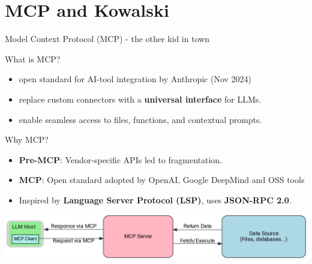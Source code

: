 \documentclass[aspectratio=169]{beamer}
\begin{document}
\section{MCP and Kowalski}
\begin{frame}{Model Context Protocol (MCP) - the other kid in town}
    \begin{block}{What is MCP?}
    \begin{itemize}
        \item open standard for AI-tool integration by Anthropic (Nov 2024)
        \item replace custom connectors with a \textbf{universal interface} for LLMs.
        \item enable seamless access to files, functions, and contextual prompts.
    \end{itemize}
    \end{block}
    \begin{block}{Why MCP?}
        \begin{itemize}
            \item \textbf{Pre-MCP}: Vendor-specific APIs led to fragmentation.
            \item \textbf{MCP}: Open standard adopted by OpenAI, Google DeepMind and OSS tools
            \item Inspired by \textbf{Language Server Protocol (LSP)}, uses \textbf{JSON-RPC 2.0}.
        \end{itemize}
    \end{block}
    \includegraphics[width=\linewidth]{mcp2}
\end{frame}
\end{document}
